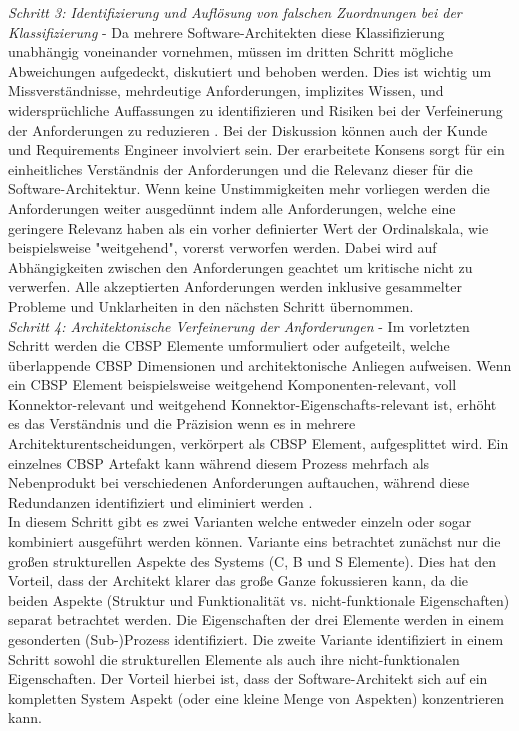 \emph{Schritt 3: Identifizierung und Aufl\"osung von falschen Zuordnungen bei der Klassifizierung} - 
Da mehrere Software-Architekten diese Klassifizierung unabh\"angig voneinander vornehmen, m\"ussen im dritten Schritt m\"ogliche Abweichungen aufgedeckt, diskutiert und behoben werden. Dies ist wichtig um Missverst\"andnisse, mehrdeutige Anforderungen, implizites Wissen, und widerspr\"uchliche Auffassungen zu identifizieren und Risiken bei der Verfeinerung der Anforderungen zu reduzieren \cite{Gru01}. Bei der Diskussion k\"onnen auch der Kunde und Requirements Engineer involviert sein. Der erarbeitete Konsens sorgt f\"ur ein einheitliches Verst\"andnis der Anforderungen und die Relevanz dieser f\"ur die Software-Architektur. Wenn keine Unstimmigkeiten mehr vorliegen werden die Anforderungen weiter ausged\"unnt indem alle Anforderungen, welche eine geringere Relevanz haben als ein vorher definierter Wert der Ordinalskala, wie beispielsweise "weitgehend", vorerst verworfen werden. Dabei wird auf Abh\"angigkeiten zwischen den Anforderungen geachtet um kritische nicht zu verwerfen. Alle akzeptierten Anforderungen werden inklusive gesammelter Probleme und Unklarheiten in den n\"achsten Schritt \"ubernommen. \\

\emph{Schritt 4: Architektonische Verfeinerung der Anforderungen} - 
Im vorletzten Schritt werden die CBSP Elemente umformuliert oder aufgeteilt, welche \"uberlappende CBSP Dimensionen und architektonische Anliegen aufweisen. Wenn ein CBSP Element beispielsweise weitgehend Komponenten-relevant, voll Konnektor-relevant und weitgehend Konnektor-Eigenschafts-relevant ist, erh\"oht es das Verst\"andnis und die Pr\"azision wenn es in mehrere Architekturentscheidungen, verk\"orpert als CBSP Element, aufgesplittet wird. Ein einzelnes CBSP Artefakt kann w\"ahrend diesem Prozess mehrfach als Nebenprodukt bei verschiedenen Anforderungen auftauchen, w\"ahrend diese Redundanzen identifiziert und eliminiert werden \cite{Gru01}. \\
In diesem Schritt gibt es zwei Varianten welche entweder einzeln oder sogar kombiniert ausgef\"uhrt werden k\"onnen. Variante eins betrachtet zun\"achst nur die gro\ss{}en strukturellen Aspekte des Systems (C, B und S Elemente). Dies hat den Vorteil, dass der Architekt klarer das gro\ss{}e Ganze fokussieren kann, da die beiden Aspekte (Struktur und Funktionalit\"at vs. nicht-funktionale Eigenschaften) separat betrachtet werden. Die Eigenschaften der drei Elemente werden in einem gesonderten (Sub-)Prozess identifiziert. Die zweite Variante identifiziert in einem Schritt sowohl die strukturellen Elemente als auch ihre nicht-funktionalen Eigenschaften. Der Vorteil hierbei ist, dass der Software-Architekt sich auf ein kompletten System Aspekt (oder eine kleine Menge von Aspekten) konzentrieren kann. \\

